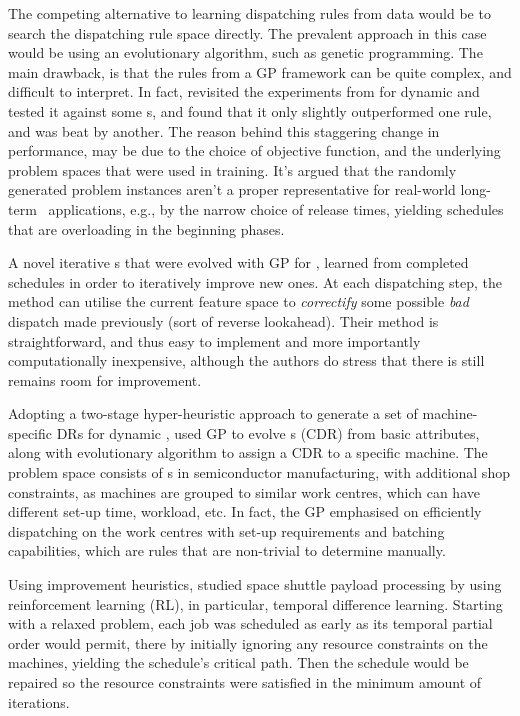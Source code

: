 \documentclass[smallextended]{svjour3}
\begin{document}
The competing alternative to learning dispatching rules from data would be to search the 
dispatching rule space directly. The prevalent approach in this case would be using an 
evolutionary algorithm, such as genetic programming.
The main drawback, is that the rules from a GP framework can be quite complex, 
and difficult to interpret.
In fact, \cite{Hildebrandt2010} revisited the experiments from \cite{Tay08} for 
dynamic \jsp and tested it against some \sdr s, and 
found that it only slightly outperformed one rule, and was beat by another. 
The reason behind this staggering change in performance, may be due to 
the choice of objective function, and the underlying problem spaces that were 
used in training.
It's argued that the randomly generated problem instances aren't a 
proper representative for real-world long-term \jsp\ applications, e.g., by the 
narrow choice of release times, yielding schedules that are overloading in the 
beginning phases.

A novel iterative \dr s that were evolved with GP for \JSP, \cite{Nguyen13} 
learned from completed schedules in order to iteratively improve new ones. 
At each dispatching step, the method can utilise the current feature space to 
\emph{correctify} some possible \emph{bad} dispatch made previously (sort of 
reverse lookahead). Their method is straightforward, and thus easy to 
implement and more importantly computationally inexpensive, although the 
authors do stress that there is still remains room for improvement.

Adopting a two-stage hyper-heuristic approach to generate a set of 
machine-specific DRs for dynamic \jsp, \cite{Pickardt2013} used GP to evolve 
\cdr s (CDR) from basic attributes, along with evolutionary algorithm to assign 
a CDR to a specific machine. 
The problem space consists of \jsp s in semiconductor manufacturing, with 
additional shop constraints, as machines are grouped to similar work centres, 
which can have different set-up time, workload, etc. 
In fact, the GP emphasised on efficiently dispatching on the work 
centres with set-up requirements and batching capabilities, which are rules 
that are non-trivial to determine manually.


Using improvement heuristics, \cite{Zhang95} studied space shuttle payload 
processing by using reinforcement learning (RL), in particular, temporal 
difference learning. 
Starting with a relaxed problem, each job was scheduled as early as its 
temporal partial order would permit, there by initially ignoring any resource 
constraints on the machines, yielding the schedule's critical path. Then the 
schedule would be repaired so the resource constraints were satisfied in the 
minimum amount of iterations.
\end{document}
